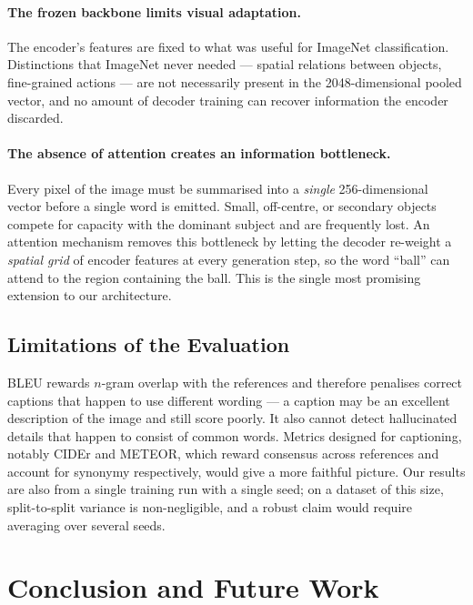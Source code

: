 \documentclass{article}
\begin{document}
\paragraph{The frozen backbone limits visual adaptation.}
The encoder's features are fixed to what was useful for ImageNet
classification. Distinctions that ImageNet never needed --- spatial relations
between objects, fine-grained actions --- are not necessarily present in the
2048-dimensional pooled vector, and no amount of decoder training can recover
information the encoder discarded.

\paragraph{The absence of attention creates an information bottleneck.}
Every pixel of the image must be summarised into a \emph{single} 256-dimensional
vector before a single word is emitted. Small, off-centre, or secondary objects
compete for capacity with the dominant subject and are frequently lost. An
attention mechanism \citep{xu2015show} removes this bottleneck by letting the
decoder re-weight a \emph{spatial grid} of encoder features at every generation
step, so the word ``ball'' can attend to the region containing the ball. This is
the single most promising extension to our architecture.

\subsection{Limitations of the Evaluation}

BLEU rewards $n$-gram overlap with the references and therefore penalises correct
captions that happen to use different wording --- a caption may be an excellent
description of the image and still score poorly. It also cannot detect
hallucinated details that happen to consist of common words. Metrics designed for
captioning, notably CIDEr \citep{vedantam2015cider} and METEOR, which reward
consensus across references and account for synonymy respectively, would give a
more faithful picture. Our results are also from a single training run with a
single seed; on a dataset of this size, split-to-split variance is non-negligible,
and a robust claim would require averaging over several seeds.

\section{Conclusion and Future Work}
\end{document}
